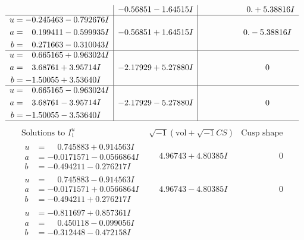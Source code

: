 \documentclass[1p]{elsarticle_modified}
\theoremstyle{definition}
\newcommand{\I}{\sqrt{-1}}
\begin{document}
$$\begin{array}{c|c|c}
 & -0.56851 - 1.64515 I & \phantom{-0.000000 -}0. + 5.38816 I \\ \hline\begin{aligned}
u &= -0.245463 - 0.792676 I \\
a &= \phantom{-}0.199411 - 0.599935 I \\
b &= \phantom{-}0.271663 - 0.310043 I\end{aligned}
 & -0.56851 + 1.64515 I & \phantom{-0.000000 } 0. - 5.38816 I \\ \hline\begin{aligned}
u &= \phantom{-}0.665165 + 0.963024 I \\
a &= \phantom{-}3.68761 + 3.95714 I \\
b &= -1.50055 + 3.53640 I\end{aligned}
 & -2.17929 + 5.27880 I & \phantom{-0.000000 } 0 \\ \hline\begin{aligned}
u &= \phantom{-}0.665165 - 0.963024 I \\
a &= \phantom{-}3.68761 - 3.95714 I \\
b &= -1.50055 - 3.53640 I\end{aligned}
 & -2.17929 - 5.27880 I & \phantom{-0.000000 } 0\\
 \hline 
 \end{array}$$\newpage$$\begin{array}{c|c|c}  
\text{Solutions to }I^u_{1}& \I (\text{vol} + \sqrt{-1}CS) & \text{Cusp shape}\\
 \hline 
\begin{aligned}
u &= \phantom{-}0.745883 + 0.914563 I \\
a &= -0.0171571 - 0.0566864 I \\
b &= -0.494211 - 0.276217 I\end{aligned}
 & \phantom{-}4.96743 + 4.80385 I & \phantom{-0.000000 } 0 \\ \hline\begin{aligned}
u &= \phantom{-}0.745883 - 0.914563 I \\
a &= -0.0171571 + 0.0566864 I \\
b &= -0.494211 + 0.276217 I\end{aligned}
 & \phantom{-}4.96743 - 4.80385 I & \phantom{-0.000000 } 0 \\ \hline\begin{aligned}
u &= -0.811697 + 0.857361 I \\
a &= \phantom{-}0.450118 - 0.099056 I \\
b &= -0.312448 - 0.472158 I\end{aligned}

\end{array}$$
\end{document}
